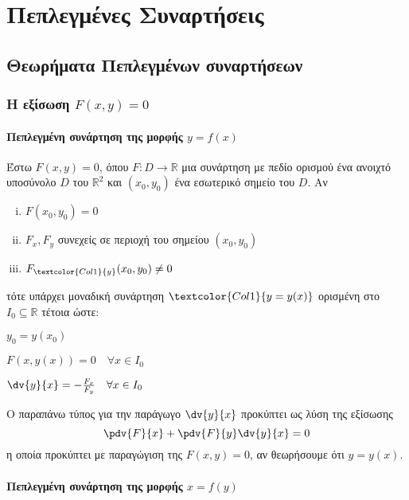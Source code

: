 \chapter{Πεπλεγμένες Συναρτήσεις}


\section{Θεωρήματα Πεπλεγμένων συναρτήσεων}

\vspace{\baselineskip}

\subsection{Η εξίσωση \ensuremath{F(x,y) = 0}}

\subsubsection{Πεπλεγμένη συνάρτηση της μορφής \ensuremath{y=f(x)}}

Έστω $ F(x,y) = 0 $, όπου $ F\colon D \to \mathbb{R} $ μια συνάρτηση με πεδίο
ορισμού ένα ανοιχτό υποσύνολο $D$ του $\mathbb{R}^{2}$ και $ (x_0,y_0) $ ένα 
εσωτερικό σημείο του $D$.  Αν 
\begin{enumerate}[(i)]
  \item $F(x_0,y_0) = 0$ 
  \item $ F_x, F_y$ συνεχείς σε περιοχή του σημείου $ (x_0,y_0) $ 
  \item $ F_{\textcolor{Col1}{y}}(x_0,y_0) \neq 0 $
\end{enumerate}
τότε υπάρχει μοναδική συνάρτηση $\textcolor{Col1}{y=y(x)} $ ορισμένη στο $ I_0 \subseteq \mathbb{R} $ 
τέτοια ώστε:
\begin{myitemize}
  \item $y_0 = y(x_0)$
  \item $F(x,y(x)) = 0 \quad \forall x \in I_0$
  \item $ \dv{y}{x} = - \frac{F_x}{F_y} \quad \forall x \in I_0  $
\end{myitemize}

\begin{rem}
  Ο παραπάνω τύπος για την παράγωγο $ \dv{y}{x} $ προκύπτει ως λύση της εξίσωσης
  \[
    \pdv{F}{x} + \pdv{F}{y}\dv{y}{x} = 0 
  \] 
  η οποία προκύπτει με παραγώγιση της $ F(x,y) = 0$, αν θεωρήσουμε ότι $ y=y(x) $.
\end{rem}

\subsubsection{Πεπλεγμένη συνάρτηση της μορφής \ensuremath{x=f(y)}}

